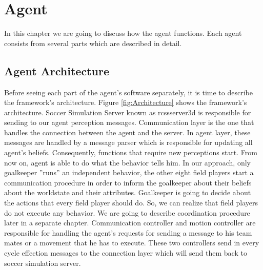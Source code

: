 \chapter{Agent}
\label{Agent}
In this chapter we are going to discuss how the agent functions. Each agent consists from several parts which are described in detail.


\section{Agent Architecture}
\label{Architecture}
Before seeing each part of the agent's software separately, it is time to describe the framework's architecture. Figure \ref{fig:Architecture}
shows the framework's architecture. Soccer Simulation Server known as rcssserver3d is responsible for sending to our agent perception messages. Communication layer is the one that handles the connection between the agent and the server. In agent layer, these messages are handled by a message parser which is responsible for updating all agent's beliefs. Consequently, functions that require new perceptions start. From now on, agent is able to do what the behavior tells him.
In our approach, only goalkeeper ''runs'' an independent behavior, the other eight field players start a communication procedure in order to inform the goalkeeper about their beliefs about the worldstate and their attributes. Goalkeeper is going to decide about the actions that every field player should do. So, we can realize that field players do not execute any behavior. We are going to describe coordination procedure later in a separate chapter.
Communication controller and motion controller are responsible for handling the agent's requests for sending a message to his team mates or a movement that he has to execute. These two controllers send in every cycle effection messages to the connection layer which will send them back to soccer simulation server.\\
